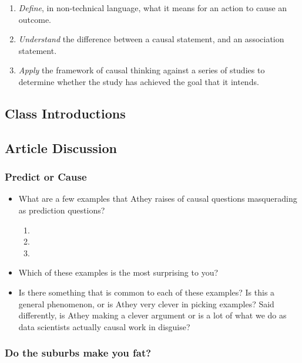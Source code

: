 \documentclass[
]{article}
\providecommand{\tightlist}{%
  \setlength{\itemsep}{0pt}\setlength{\parskip}{0pt}}
\theoremstyle{definition}
\theoremstyle{definition}
\theoremstyle{definition}
\theoremstyle{definition}
\theoremstyle{remark}
\begin{document}
\begin{enumerate}
\def\labelenumi{\arabic{enumi}.}
\tightlist
\item
  \emph{Define}, in non-technical language, what it means for an action to cause an outcome.
\item
  \emph{Understand} the difference between a causal statement, and an association statement.
\item
  \emph{Apply} the framework of causal thinking against a series of studies to determine whether the study has achieved the goal that it intends.
\end{enumerate}

\subsection{Class Introductions}\label{class-introductions}

\subsection{Article Discussion}\label{article-discussion}

\subsubsection{Predict or Cause}\label{predict-or-cause}

\begin{itemize}
\tightlist
\item
  What are a few examples that Athey raises of causal questions masquerading as prediction questions?

  \begin{enumerate}
  \def\labelenumi{\arabic{enumi}.}
  \tightlist
  \item
  \item
  \item
  \end{enumerate}
\item
  Which of these examples is the most surprising to you?
\item
  Is there something that is common to each of these examples? Is this a general phenomenon, or is Athey very clever in picking examples? Said differently, is Athey making a clever argument or is a lot of what we do as data scientists actually causal work in disguise?
\end{itemize}

\subsubsection{Do the suburbs make you fat?}\label{do-the-suburbs-make-you-fat}
\end{document}
